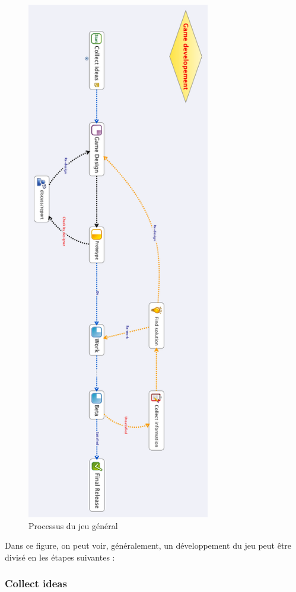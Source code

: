 \begin{figure}[htbp]
	\centering
		\includegraphics[height=9in]{XMinds/Gamedevelopement.png}
	\caption{Processus du jeu général}
	\label{fig:XMinds_Gamedevelopement}
\end{figure}

Dans ce figure, on peut voir, généralement, un développement du jeu peut être divisé en les étapes suivantes :

\subsubsection{Collect ideas} %

